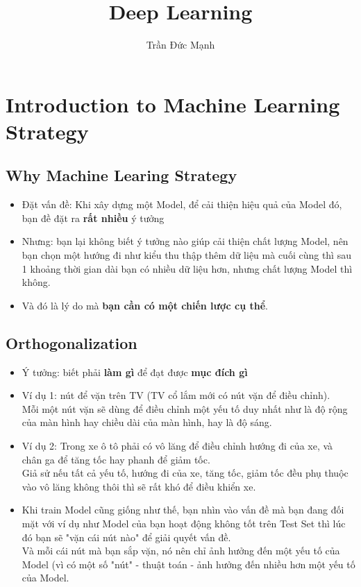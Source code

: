 \documentclass[12pt,a4paper]{report}
\author{Trần Đức Mạnh}
\title{Deep Learning}
\begin{document}
\tableofcontents

\chapter{Introduction to Machine Learning Strategy}
	\section{Why Machine Learing Strategy}
		\begin{itemize}
			\item Đặt vấn đề: Khi xây dựng một Model, để cải thiện hiệu quả của Model đó, bạn đề đặt ra \textbf{rất nhiều} ý tưởng
			\item Nhưng: bạn lại không biết ý tưởng nào giúp cải thiện chất lượng Model, nên bạn chọn một hướng đi như kiểu thu thập thêm dữ liệu mà cuối cùng thì sau 1 
			khoảng thời gian dài bạn có nhiều dữ liệu hơn, nhưng chất lượng Model thì không.
			\item Và đó là lý do mà \textbf{bạn cần có một chiến lược cụ thể}.
		\end{itemize}
	\section{Orthogonalization}
		\begin{itemize}
			\item Ý tưởng: biết phải \textbf{làm gì} để đạt được \textbf{mục 	
			đích gì}
			\item Ví dụ 1: nút để vặn trên TV (TV cổ lắm mới có nút vặn để 
			điều chỉnh).\\ Mỗi một nút vặn sẽ dùng để điều chỉnh một yếu tố 
			duy nhất như là độ rộng của màn hình hay chiều dài của màn hình, 
			hay là độ sáng.
			\item Ví dụ 2: Trong xe ô tô phải có vô lăng để điều chỉnh hướng 
			đi của xe, và chân ga để tăng tốc hay phanh để giảm tốc.\\
			Giả sử nếu tất cả yếu tố, hướng đi của xe, tăng tốc, giảm tốc đều 
			phụ thuộc vào vô lăng không thôi thì sẽ rất khó để điều khiển xe.
			\item Khi train Model cũng giống như thế, bạn nhìn vào vấn đề mà 
			bạn đang đối mặt với ví dụ như Model của bạn hoạt động không tốt 
			trên Test Set thì lúc đó bạn sẽ "vặn cái nút nào" để giải quyết 
			vấn đề.\\ Và mỗi cái nút mà bạn sắp vặn, nó nên chỉ ảnh hưởng đến 
			một yếu tố của Model (vì có một số "nút" - thuật toán - ảnh hưởng 
			đến nhiều hơn một yếu tố của Model.
		\end{itemize}
\end{document}
